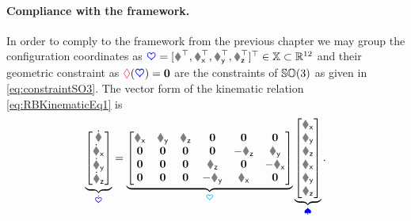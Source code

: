 \paragraph*{Compliance with the framework.}
In order to comply to the framework from the previous chapter we may group the configuration coordinates as $\sysCoord = [\r^\top, \Rx^\top, \Ry^\top, \Rz^\top]^\top \in \configSpace \subset\RealNum^{12}$ and their geometric constraint as $\boldsymbol{\textcolor{red}{\Diamond}}(\boldsymbol{\textcolor{blue}{\heartsuit}}) = \boldsymbol{0}$ are the constraints of $\mathbb{SO}(3)$ as given in \eqref{eq:constraintSO3}.
The vector form of the kinematic relation \eqref{eq:RBKinematicEq1} is 
\begin{align}\label{eq:RBKinematicEq2}
 \underbrace{\begin{bmatrix} \rd \\ \Rxd \\ \Ryd \\ \Rzd  \end{bmatrix}}_{\sysCoordd}
 = 
 \underbrace{\begin{bmatrix}
  \Rx & \Ry & \Rz & \tuple{0} & \tuple{0} & \tuple{0} \\
  \tuple{0} & \tuple{0} & \tuple{0} & \tuple{0} & -\Rz & \Ry \\
  \tuple{0} & \tuple{0} & \tuple{0} & \Rz & \tuple{0} & -\Rx \\
  \tuple{0} & \tuple{0} & \tuple{0} & -\Ry & \Rx & \tuple{0}
 \end{bmatrix}}_{\kinMat}
 \underbrace{\begin{bmatrix} \vx \\ \vy \\ \vz \\ \wx \\ \wy \\ \wz \end{bmatrix}}_{\sysVel}
 .
\end{align}

